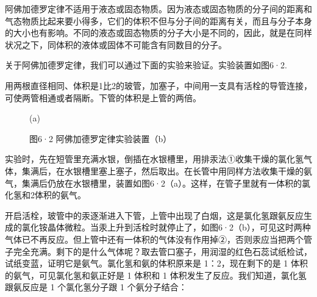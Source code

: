 阿佛加德罗定律不适用于液态或固态物质。因为液态或固态物质的分子间的距离和气态物质比起来要小得多，它们的体积不但与分子间的距离有关，而且与分子本身的大小也有影响。不同的液态或固态物质的分子大小是不同的，因此，就是在同样状况之下，同体积的液体或固体不可能含有同数目的分子。

关于阿佛加德罗定律，我们可以通过下面的实验来验证。实验装置如图6·2.

用两根直径相同、体积是1比2的玻管，加塞子，中间用一支具有活栓的导管连接，可使两管相通或者隔断。下管的体积是上管的两倍。

\begin{figure}
\centering
\caption{(a)}
\end{figure}

\begin{figure}
\centering
\caption{图6·2 阿佛加德罗定律实验装置（b）}
\end{figure}

实验时，先在短管里充满水银，倒插在水银槽里，用排汞法①收集干燥的氯化氢气体，集满后，在水银槽里塞上塞子，然后取出。在长管中用同样方法收集干燥的氨气，集满后仍放在水银槽里，装置如图6·2（a）。这样，在管子里就有一体积的氯化氢和2体积的氨气。

开启活栓，玻管中的汞逐渐进入下管，上管中出现了白烟，这是氯化氢跟氨反应生成的氯化铵晶体微粒。当汞上升到活栓时就停止了，如图6·2（b），可见这时两种气体已不再反应。但上管中还有一体积的气体没有作用掉②，否则汞应当把两个管子完全充满。剩下的是什么气体呢？取去管口塞子，用润湿的红色石蕊试纸检试，试纸变蓝，证明它是氨气。氯化氢和氨的体积原来是
1：2，现在剩下的是 1 体积的氨气，可见氯化氢和氨正好是 1 体积和 1
体积发生了反应。我们知道，氯化氢跟氨反应是 1 个氯化氢分子跟 1
个氨分子结合：

